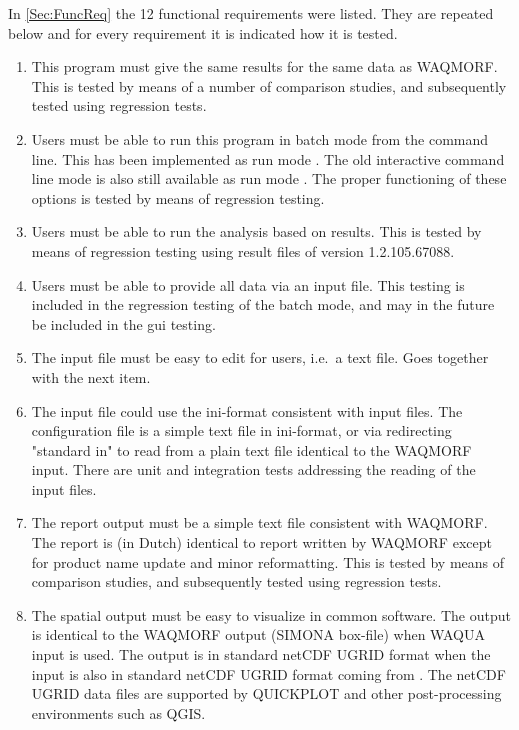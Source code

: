 In \autoref{Sec:FuncReq} the 12 functional requirements were listed.
They are repeated below and for every requirement it is indicated how it is tested.

\begin{enumerate}
\item This program must give the same results for the same data as WAQMORF.
This is tested by means of a number of comparison studies, and subsequently tested using regression tests.

\item Users must be able to run this program in batch mode from the command line.
This has been implemented as run mode .
The old interactive command line mode is also still available as run mode .
The proper functioning of these options is tested by means of regression testing.

\item Users must be able to run the analysis based on \dflowfm results.
This is tested by means of regression testing using result files of \dflowfm version 1.2.105.67088.

\item Users must be able to provide all data via an input file.
This testing is included in the regression testing of the batch mode, and may in the future be included in the gui testing.

\item The input file must be easy to edit for users, i.e.~a text file.
Goes together with the next item.
\item The input file could use the ini-format consistent with \dflowfm input files.
The \dfastmi configuration file is a simple text file in ini-format, or via redirecting "standard in" to read from a plain text file identical to the WAQMORF input.
There are unit and integration tests addressing the reading of the input files.

\item The report output must be a simple text file consistent with WAQMORF.
The report is (in Dutch) identical to report written by WAQMORF except for product name update and minor reformatting.
This is tested by means of comparison studies, and subsequently tested using regression tests.

\item The spatial output must be easy to visualize in common software.
The output is identical to the WAQMORF output (SIMONA box-file) when WAQUA input is used.
The output is in standard netCDF UGRID format when the input is also in standard netCDF UGRID format coming from \dflowfm.
The netCDF UGRID data files are supported by QUICKPLOT and other post-processing environments such as QGIS.


\end{enumerate}
